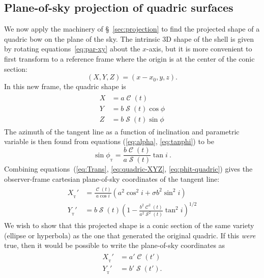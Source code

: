 \documentclass[useAMS, usenatbib, a4paper]{mnras}
\DeclareMathOperator{\Sin}{\mathcal{S}}
\DeclareMathOperator{\Cos}{\mathcal{C}}
\newcommand\T{_{\mathrm{\scriptscriptstyle T}}}
\begin{document}
\subsection{Plane-of-sky projection of quadric surfaces} 

We now apply the machinery of \S~\ref{sec:projection} to find the
projected shape of a quadric bow on the plane of the sky.  The
intrinsic 3D shape of the shell is given by rotating
equations~\eqref{eq:par-xy} about the \(x\)-axis, but it is more
convenient to first transform to a reference frame where the origin is
at the center of the conic section:
\begin{equation}
  \label{eq:xyz-XYZ}
  (X, Y, Z) = (x - x_0, y, z) . 
\end{equation}
In this new frame, the quadric shape is
\begin{gather}
  \label{eq:quadric-XYZ}
  \begin{aligned}
    X &= a\Cos(t) \\ 
    Y &= b \Sin(t)\cos\phi \\
    Z &= b \Sin(t)\sin\phi
  \end{aligned}
\end{gather}
The azimuth of the tangent line as a function of inclination and
parametric variable is then found from equations (\ref{eq:alpha},
\ref{eq:tanphi}) to be
\begin{equation}
  \label{eq:phit-quadric}
  \sin\phi_{\T} = \frac{b \Cos(t)} {a \Sin(t)} \tan i \ .
\end{equation}
Combining equations~(\ref{eq:Trans}, \ref{eq:quadric-XYZ},
\ref{eq:phit-quadric}) gives the observer-frame cartesian
plane-of-sky coordinates of the tangent line:
\begin{gather}
  \label{eq:conic-projected-XY}
  \begin{aligned}
    X_{\T}' & = \frac{\Cos(t)}{a\cos i}
    \left(a^2\cos^2 i + \sigma b^2\sin^2 i\right)
    \\
    Y_{\T}' &= b\Sin(t)
    \left(
      1 - \frac{b^2 \Cos^2(t)}{a^2 \Sin^2(t)}
      \tan^2 i\right)^{1/2}
  \end{aligned}
\end{gather}
We wish to show that this projected shape is a conic section of the
same variety (ellipse or hyperbola) as the one that generated the
original quadric.  If this \emph{were} true, then it would be possible
to write the plane-of-sky coordinates as
\begin{gather}
  \begin{aligned}
    X_{\T}' &= a'\Cos( t')  \\
    Y_{\T}' &= b'\Sin (t')  . 
  \end{aligned}\label{eq:conic-projected-XY-conic}
\end{gather}
\end{document}

